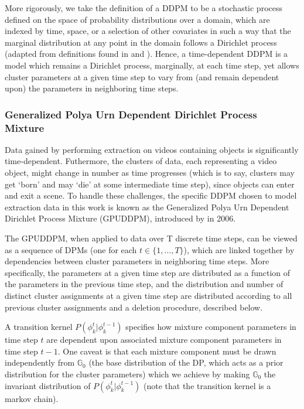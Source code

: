 \documentclass[smallcondensed, final]{svjour3}
\begin{document}
More rigorously, we take the definition of a DDPM to be a stochastic process defined on the space of probability distributions over a domain, which are indexed by time, space, or a selection of other covariates in such a way that the marginal distribution at any point in the domain follows a Dirichlet process (adapted from definitions found in \cite{gasthaus_thesis} and \cite{griffin2006order}). Hence, a time-dependent DDPM is a model which remains a Dirichlet process, marginally, at each time step, yet allows cluster parameters at a given time step to vary from (and remain dependent upon) the parameters in neighboring time steps.



\subsubsection{Generalized Polya Urn Dependent Dirichlet Process Mixture}
\label{sec:gpudpm}

Data gained by performing extraction on videos containing objects is significantly time-dependent. Futhermore, the clusters of data, each representing a video object, might change in number as time progresses (which is to say, clusters may get `born' and may `die' at some intermediate time step), since objects can enter and exit a scene. To handle these challenges, the specific DDPM chosen to model extraction data in this work is known as the Generalized Polya Urn Dependent Dirichlet Process Mixture (GPUDDPM), introduced by \cite{caron_2007} in 2006.

The GPUDDPM, when applied to data over T discrete time steps, can be viewed as a sequence of DPMs (one for each $t \in \{1, \ldots, T \}$), which are linked together by dependencies between cluster parameters in neighboring time steps. More specifically, the parameters at a given time step are distributed as a function of the parameters in the previous time step, and the distribution and number of distinct cluster assignments at a given time step are distributed according to all previous cluster assignments and a deletion procedure, described below.

A transition kernel $P(\phi_{k}^{t} | \phi_{k}^{t-1})$ specifies how mixture component parameters in time step $t$ are dependent upon associated mixture component parameters in time step $t-1$. One caveat is that each mixture component must be drawn independently from $\mathbb{G}_{0}$ (the base distribution of the DP, which acts as a prior distribution for the cluster parameters) which we achieve by making $\mathbb{G}_{0}$ the invariant distribution of $P(\phi_{k}^{t} | \phi_{k}^{t-1})$ (note that the transition kernel is a markov chain). 
\end{document}
